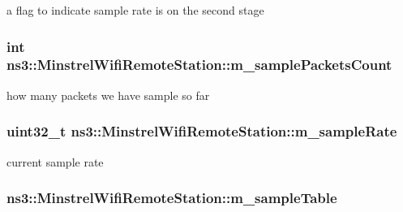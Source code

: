 a flag to indicate sample rate is on the second stage 

\subsubsection[{\texorpdfstring{m\+\_\+sample\+Packets\+Count}{m_samplePacketsCount}}]{\setlength{\rightskip}{0pt plus 5cm}int ns3\+::\+Minstrel\+Wifi\+Remote\+Station\+::m\+\_\+sample\+Packets\+Count}\hypertarget{structns3_1_1MinstrelWifiRemoteStation_abad4f1b41d39ec2a0f1a7f7c3516ccf0}{}\label{structns3_1_1MinstrelWifiRemoteStation_abad4f1b41d39ec2a0f1a7f7c3516ccf0}


how many packets we have sample so far 

\subsubsection[{\texorpdfstring{m\+\_\+sample\+Rate}{m_sampleRate}}]{\setlength{\rightskip}{0pt plus 5cm}uint32\+\_\+t ns3\+::\+Minstrel\+Wifi\+Remote\+Station\+::m\+\_\+sample\+Rate}\hypertarget{structns3_1_1MinstrelWifiRemoteStation_a8ad580c92efbc6d679e95d8432746a22}{}\label{structns3_1_1MinstrelWifiRemoteStation_a8ad580c92efbc6d679e95d8432746a22}


current sample rate 

\subsubsection[{\texorpdfstring{m\+\_\+sample\+Table}{m_sampleTable}}]{ ns3\+::\+Minstrel\+Wifi\+Remote\+Station\+::m\+\_\+sample\+Table}\hypertarget{structns3_1_1MinstrelWifiRemoteStation_ab8cfb8324723910001df122cc7f78a21}{}\label{structns3_1_1MinstrelWifiRemoteStation_ab8cfb8324723910001df122cc7f78a21}



